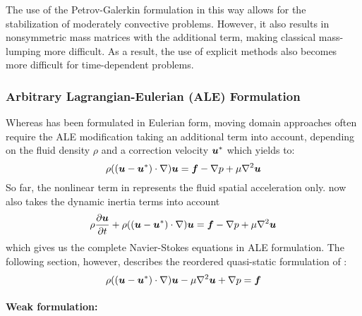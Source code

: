 The use of the Petrov-Galerkin formulation in this way allows for the stabilization of moderately convective problems. However, it also results in nonsymmetric mass matrices with the additional term, making classical mass-lumping more difficult. As a result, the use of explicit methods also becomes more difficult for time-dependent problems. 


\subsubsection{Arbitrary Lagrangian-Eulerian (ALE) Formulation}
Whereas  has been formulated in Eulerian form, moving domain approaches often require the ALE modification taking an additional term into account, depending on the fluid density $\rho$ and a correction velocity $\boldsymbol{u}^*$ which yields to:
\begin{equation}
    \rho((\vectr{u}-\vectr{u}^*)\cdot\grad)\vectr{u}=\vectr{f}-\gradient{}{p}+\mu\laplacian{\vectr{u}}
  \label{eqn:NavierStokesequationALE}
\end{equation}
So far, the nonlinear term in  represents the fluid spatial acceleration only.  now also takes the dynamic inertia terms into account
\begin{equation}
    \rho\delby{\vectr{u}}{t}+ \rho((\vectr{u}-\vectr{u}^*)\cdot\grad)\vectr{u}=\vectr{f}-\gradient{}{p}+\mu\laplacian{\vectr{u}}
  \label{eqn:NavierStokesequation2}
\end{equation}
which gives us the complete Navier-Stokes equations in ALE formulation.
The following section, however, describes the reordered quasi-static formulation of  :
\begin{equation}
\rho((\vectr{u}-\vectr{u}^*)\cdot\grad)\vectr{u}-\mu\laplacian{\vectr{u}}+\gradient{}{p}=\vectr{f}
  \label{eqn:NavierStokesequationALE2}
\end{equation}

\paragraph{Weak formulation:}

